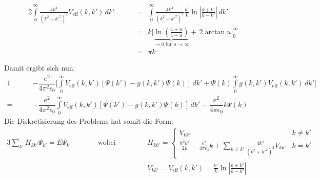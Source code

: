 \begin{alignat*}{2}
\int\limits_{0}^{\infty} \frac{4k^4}{(k^2+k '^2)^2}V_\text{eff}(k,k')\,dk' 
						&& \ \ &=\ \ \int\limits_{0}^{\infty} \frac{4k^4}{(k^2+k '^2)^2}\frac{k '}{k}\ln{\left |\frac{k + k '}{k-k'}\right |}\,dk' \\
%
%
						&& \ \ &=\ \ 	k\Big[\underbrace{\ln\left (\frac{1+u}{1-u}\right )}_{\rightarrow 0 \text{ für } u\rightarrow \infty}+\, 2\arctan{u}\Big]_{0}^{\infty}\\  
						&& \ \ &=\ \ 	\pi k
\end{alignat*}
\begin{comment}
%
%
						&& \ \ &=\ \ 	k\int\limits_{0}^{\infty} \frac{4u}{(1+u^2)^2}\ln{\left |\frac{1 + u}{1-u}\right |}\,du \qquad\text{Betrag auflösen}\\
						&& \ \ &=\ \ 	k\int\limits_{0}^{1} \left (\frac{-2}{1+u^2}\right )'\ln{\left (\frac{1 + u}{1-u}\right )}\,du + k\int\limits_{1}^{\infty} \left( \frac{-2}{1+u^2}\right )'\ln{\left (\frac{1 + u}{u-1}\right )}\,du\\
						&& \ \ &\stackrel{\text{P.I.}}{=}\ \ \underbrace{k\left (\frac{-2}{1+u^2}\right )\ln{\left ( \frac{1 + u}{1-u}\right )}\Big |_{0}^{1}+k\left (\frac{-2}{1+u^2}\right )\ln{\left ( \frac{1 + u}{u-1}\right )}\Big |_{1}^{\infty}}_{\text{C.H.}\,\rightarrow \,0}
						+k\int\limits_{0}^{\infty} \frac{2}{1+u^2}\frac{1 - u}{1+u}\frac{2}{(1-u)^2}\,du \\
						&& \ \ &=\ \ 	k\int\limits_{0}^{\infty} \frac{4}{(1-u^4)}\,du  \\
						&& \ \ &=\ \ 	k\int\limits_{0}^{\infty} \left (\frac{1}{1-u}+\frac{1}{1+u}+\frac{2}{1+u^2}\right )\,du\\
						&& \ \ &=\ \ 	k\Big[-\ln{(1-u)}+\ln{(1+u)}+ 2\arctan{u}\Big]_{0}^{\infty}\\  
%
\end{comment}

Damit ergibt sich nun: 
\begin{alignat*}{1}
	&-\dfrac{e^2}{4\pi ^2 \epsilon_0} \Big [\int\limits_{0}^{\infty} V_\text{eff}(k,k')\left [\Psi(k ')-g(k,k')\Psi(k)\right ]\,dk'  
+  \Psi(k)\int\limits_{0}^{\infty} g(k,k')V_\text{eff}(k,k')\,dk' \Big]   \\
= 	\qquad &-\dfrac{e^2}{4\pi^2 \epsilon_0} \int\limits_{0}^{\infty} V_\text{eff}(k,k')\left [\Psi(k ')-g(k,k')\Psi(k)\right ]\,dk' 
-  \dfrac{e^2}{4\pi \epsilon_0}  k\Psi(k) 
\end{alignat*}
Die Diskretisierung des Problems hat somit die Form: 
\begin{alignat*}{3}
\sum\limits_{k'}H_{kk'}\Psi_{k'} = E \Psi_k && \qquad \text{  wobei}\qquad && &H_{kk'}= 
	 \begin{cases}
     V_{kk'}  &k \neq k' \\
     \frac{\hbar ^2 k^2}{2\mu} -\frac{e^2}{4\pi \epsilon_0}k +\sum\limits_{k\neq k'}\frac{4k^4}{(k^2+k '^2)^2}V_{kk'} &k=k'
   \end{cases}\\
  &&  && &V_{kk'} = V_\text{eff}(k,k')=\frac{k '}{k}\ln{\left |\frac{k + k '}{k-k'}\right |}
\end{alignat*}
